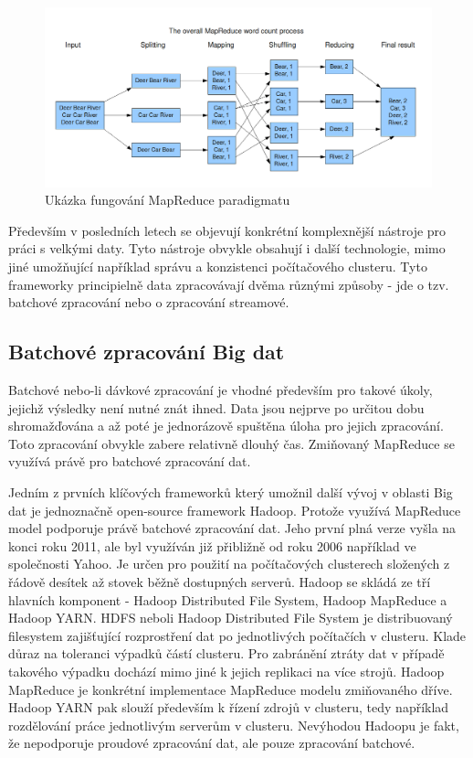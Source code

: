\documentclass[thesis=B,czech]{FITthesis}[2012/06/26]
\begin{document}
	\begin{figure}[ht]
    	\centering
    	\includegraphics[width=1\textwidth]{images/mapreduce.png}
    	\caption{Ukázka fungování MapReduce paradigmatu \cite{mapreduce-img} }
    	\label{fig:mapreduce}
	\end{figure}
	
	Především v posledních letech se objevují konkrétní komplexnější nástroje pro práci s velkými daty. Tyto nástroje obvykle obsahují i další technologie, mimo jiné umožňující například správu a konzistenci počítačového clusteru. Tyto frameworky principielně data zpracovávají dvěma různými způsoby - jde o tzv. batchové zpracování nebo o zpracování streamové. 
	
\subsection{Batchové zpracování Big dat}
	Batchové nebo-li dávkové zpracování je vhodné především pro takové úkoly, jejichž výsledky není nutné znát ihned. Data jsou nejprve po určitou dobu shromažďována a až poté je jednorázově spuštěna úloha pro jejich zpracování. Toto zpracování obvykle zabere relativně dlouhý čas. Zmiňovaný MapReduce se využívá právě pro batchové zpracování dat. 

	Jedním z prvních klíčových frameworků který umožnil další vývoj v oblasti Big dat je jednoznačně open-source framework Hadoop\cite{hadoop-home}. Protože využívá MapReduce model podporuje právě batchové zpracování dat. Jeho první plná verze vyšla na konci roku 2011, ale byl využíván již přibližně od roku 2006 například ve společnosti Yahoo\cite{hadoop-history}. Je určen pro použití na počítačových clusterech složených z řádově desítek až stovek běžně dostupných serverů. Hadoop se skládá ze tří hlavních komponent - Hadoop Distributed File System, Hadoop MapReduce a Hadoop YARN. HDFS neboli Hadoop Distributed File System je distribuovaný filesystem zajišťující rozprostření dat po jednotlivých počítačích v clusteru. Klade důraz na toleranci výpadků částí clusteru. Pro zabránění ztráty dat v případě takového výpadku dochází mimo jiné k jejich replikaci na více strojů. Hadoop MapReduce je konkrétní implementace MapReduce modelu zmiňovaného dříve. Hadoop YARN pak slouží především k řízení zdrojů v clusteru, tedy například rozdělování práce jednotlivým serverům v clusteru. Nevýhodou Hadoopu je fakt, že nepodporuje proudové zpracování dat, ale pouze zpracování batchové. 
	
\end{document}
